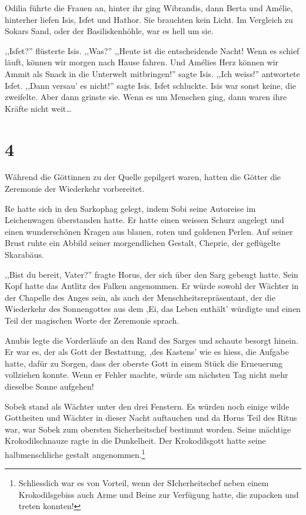Odilia führte die Frauen an, hinter ihr ging Wibrandis, dann Berta und Amélie, hinterher liefen Isis, Isfet und Hathor. Sie brauchten kein Licht. Im Vergleich zu Sokars Sand, oder der Basiliskenhöhle, war es hell um sie.

,,Isfet?'' flüsterte Isis. ,,Was?'' ,,Heute ist die entscheidende Nacht! Wenn es schief läuft, können wir morgen nach Hause fahren. Und Amélies Herz können wir Ammit als Snack in die Unterwelt mitbringen!'' sagte Isis. ,,Ich weiss!'' antwortete Isfet. ,,Dann versau' es nicht!'' sagte Isis. Isfet schluckte. Isis war sonst keine, die zweifelte. Aber dann grinste sie. Wenn es um Menschen ging, dann waren ihre Kräfte nicht weit\dots

\section*{4}

Während die Göttinnen zu der Quelle gepilgert waren, hatten die Götter die Zeremonie der Wiederkehr vorbereitet. 

Re hatte sich in den Sarkophag gelegt, indem Sobi seine Autoreise im Leichenwagen überstanden hatte. Er hatte einen weissen Schurz angelegt und einen wunderschönen Kragen aus blauen, roten und goldenen Perlen. Auf seiner Brust ruhte ein Abbild seiner morgendlichen Gestalt, Cheprie, der geflügelte Skarabäus. 

,,Bist du bereit, Vater?'' fragte Horus, der sich über den Sarg gebeugt hatte. Sein Kopf hatte das Antlitz des Falken angenommen. Er würde sowohl der Wächter in der Chapelle des Anges sein, als auch der Menschheitsrepräsentant, der die Wiederkehr des Sonnengottes aus dem ,Ei, das Leben enthält' würdigte und einen Teil der magischen Worte der Zeremonie sprach.

Anubis legte die Vorderläufe an den Rand des Sarges und schaute besorgt hinein. Er war es, der als Gott der Bestattung, ,des Kastens' wie es hiess, die Aufgabe hatte, dafür zu Sorgen, dass der oberste Gott in einem Stück die Erneuerung vollziehen konnte. Wenn er Fehler machte, würde am nächsten Tag nicht mehr dieselbe Sonne aufgehen!

Sobek stand als Wächter unter den drei Fenstern. Es würden noch einige wilde Gottheiten und Wächter in dieser Nacht auftauchen und da Horus Teil des Ritus war, war Sobek zum obersten Sicherheitschef bestimmt worden. Seine mächtige Krokodilschnauze ragte in die Dunkelheit. Der Krokodilsgott hatte seine halbmenschliche gestalt angenommen.\footnote{Schliesslich war es von Vorteil, wenn der SIcherheitschef neben einem Krokodilsgebiss auch Arme und Beine zur Verfügung hatte, die zupacken und treten konnten!}

